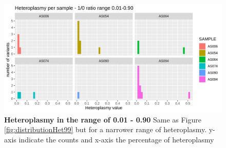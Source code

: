 \begin{figure}[H]
\centering
\includegraphics[width=1\textwidth]{Fig/het90.png}
\decoRule
\caption{\textbf{Heteroplasmy in the range of 0.01 - 0.90} Same as Figure \ref{fig:distributionHet99} but for a narrower range of heteroplasmy. y-axis indicate the counts and x-axis the percentage of heteroplasmy }
\label{fig:distribution90}
\end{figure}



\newpage
